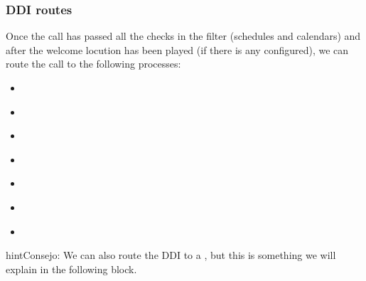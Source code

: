 \documentclass[letterpaper,10pt,spanish]{sphinxmanual}
\begin{document}
\subsubsection{DDI routes}
\label{administration_portal/client/vpbx/ddis:routing-logics}\label{administration_portal/client/vpbx/ddis:ddi-routes}
Once the call has passed all the checks in the filter (schedules and calendars)
and after the welcome locution has been played (if there is any configured),
we can route the call to the following processes:
\begin{itemize}
\item {} 
{\hyperref[administration_portal/client/vpbx/users:users]{}}

\item {} 
{\hyperref[administration_portal/client/vpbx/routing_endpoints/hunt_groups:huntgroups]{}}

\item {} 
{\hyperref[administration_portal/client/vpbx/routing_endpoints/ivrs:ivrs]{}}

\item {} 
{\hyperref[administration_portal/client/vpbx/routing_endpoints/conference_rooms:conference\string-rooms]{}}

\item {} 
{\hyperref[administration_portal/client/vpbx/routing_endpoints/conditional_routes:conditional\string-routes]{}}

\item {} 
{\hyperref[administration_portal/client/vpbx/routing_endpoints/queues:queues]{}}

\item {} 
{\hyperref[administration_portal/client/vpbx/routing_endpoints/friends/index:friends]{}}

\end{itemize}

\begin{notice}{hint}{Consejo:}
We can also route the DDI to a {\hyperref[administration_portal/client/vpbx/faxes:faxing\string-system]{}}, but
this is something we will explain in the following block.
\end{notice}
\end{document}
